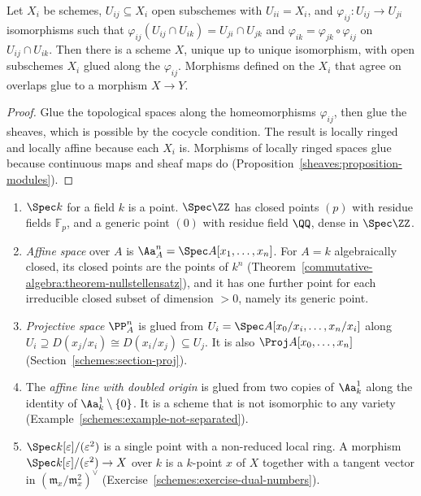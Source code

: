 \begin{proposition}\label{schemes:proposition-gluing}
Let $X_i$ be schemes, $U_{ij} \subseteq X_i$ open subschemes with $U_{ii} = X_i$, and $\varphi_{ij} \colon U_{ij} \to U_{ji}$ isomorphisms such that
$\varphi_{ij}(U_{ij} \cap U_{ik}) = U_{ji} \cap U_{jk}$ and $\varphi_{ik} = \varphi_{jk} \circ \varphi_{ij}$ on $U_{ij} \cap U_{ik}$. Then there is a scheme $X$,
unique up to unique isomorphism, with open subschemes $X_i$ glued along the $\varphi_{ij}$. Morphisms defined on the $X_i$ that agree on overlaps
glue to a morphism $X \to Y$.
\end{proposition}

\begin{proof}
Glue the topological spaces along the homeomorphisms $\varphi_{ij}$, then glue the sheaves, which is possible by the cocycle condition. The result is
locally ringed and locally affine because each $X_i$ is. Morphisms of locally ringed spaces glue because continuous maps and sheaf maps do
(Proposition~\ref{sheaves:proposition-modules}).
\end{proof}

\begin{example}\label{schemes:example-schemes}
\begin{enumerate}
\item $\Spec k$ for a field $k$ is a point. $\Spec\ZZ$ has closed points $(p)$ with residue fields $\mathbb{F}_p$, and a generic point $(0)$ with residue
field $\QQ$, dense in $\Spec\ZZ$.
\item \emph{Affine space} over $A$ is $\Aa^n_A = \Spec A[x_1, \ldots, x_n]$. For $A = k$ algebraically closed, its closed points are the points of
$k^n$ (Theorem~\ref{commutative-algebra:theorem-nullstellensatz}), and it has one further point for each irreducible closed subset of dimension
$> 0$, namely its generic point.
\item \emph{Projective space} $\PP^n_A$ is glued from $U_i = \Spec A[x_0/x_i, \ldots, x_n/x_i]$ along $U_i \supseteq D(x_j/x_i) \cong D(x_i/x_j) \subseteq U_j$. It is
also $\Proj A[x_0, \ldots, x_n]$ (Section~\ref{schemes:section-proj}).
\item The \emph{affine line with doubled origin} is glued from two copies of $\Aa^1_k$ along the identity of $\Aa^1_k \setminus \{0\}$. It is a scheme that is
not isomorphic to any variety (Example~\ref{schemes:example-not-separated}).
\item $\Spec k[\varepsilon]/(\varepsilon^2)$ is a single point with a non-reduced local ring. A morphism $\Spec k[\varepsilon]/(\varepsilon^2) \to X$ over $k$ is a
$k$-point $x$ of $X$ together with a tangent vector in $(\mathfrak{m}_x/\mathfrak{m}_x^2)^\vee$ (Exercise~\ref{schemes:exercise-dual-numbers}).
\end{enumerate}
\end{example}

